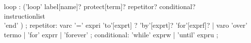 \begin{rail}
loop : ('loop' label[name]? protect[term]?  repetitor? conditional? \\
            instructionlist \\
           'end'     )
                 ;
repetitor: varc '=' expri 'to'[exprt] ? 'by'[exprt]? 'for'[exprf]? |
                varo 'over' termo |
                'for' exprr |
                'forever'
                 ;
conditional: 'while' exprw |
                    'until' expru
                 ;
\end{rail}
